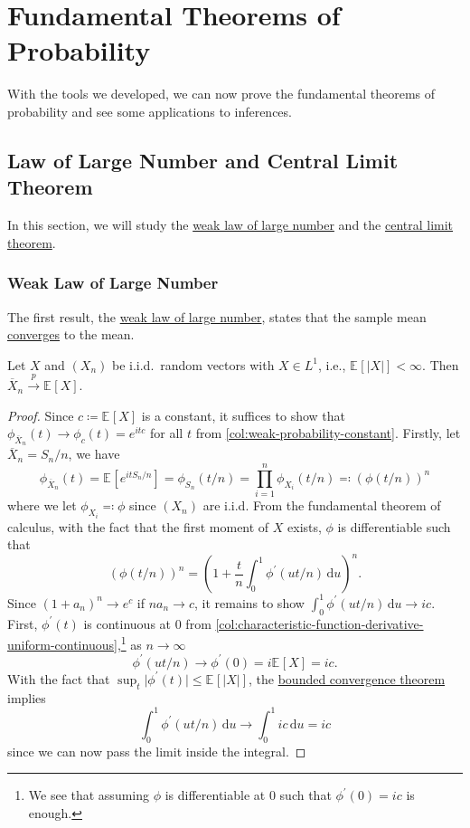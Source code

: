 \chapter{Fundamental Theorems of Probability}
With the tools we developed, we can now prove the fundamental theorems of probability and see some applications to inferences.

\section{Law of Large Number and Central Limit Theorem}
In this section, we will study the \hyperref[thm:WLLN]{weak law of large number} and the \hyperref[thm:CLT]{central limit theorem}.

\subsection{Weak Law of Large Number}
The first result, the \hyperref[thm:WLLN]{weak law of large number}, states that the sample mean \hyperref[def:converge-in-probability]{converges} to the mean.

\begin{theorem}\label{thm:WLLN}
	Let \(X\) and \((X_n)\) be i.i.d.\ random vectors with \(X \in L^1\), i.e., \(\mathbb{E}_{}[\vert X \vert ] < \infty \). Then \(\overline{X} _n \overset{p}{\to } \mathbb{E}_{}[X] \).
\end{theorem}
\begin{proof}
	Since \(c \coloneqq \mathbb{E}_{}[X] \) is a constant, it suffices to show that \(\phi _{\overline{X} _n}(t) \to \phi _{c} (t) = e^{itc}\) for all \(t\) from \autoref{col:weak-probability-constant}. Firstly, let \(\overline{X} _n = S_n / n\), we have
	\[
		\phi _{\overline{X} _n}(t)
		= \mathbb{E}_{}[e^{it S_n / n}]
		= \phi _{S_n}(t / n)
		= \prod_{i=1}^{n} \phi _{X_i}(t / n)
		\eqqcolon \left( \phi (t / n) \right) ^n
	\]
	where we let \(\phi _{X_i} \eqqcolon \phi \) since \((X_n)\) are i.i.d. From the fundamental theorem of calculus, with the fact that the first moment of \(X\) exists, \(\phi \) is differentiable such that
	\[
		\left( \phi (t / n) \right) ^n
		= \left( 1 + \frac{t}{n} \int_{0}^{1} \phi ^{\prime} (u t / n) \,\mathrm{d}u  \right) ^n .
	\]
	Since \((1 + a_n)^n \to e^c\) if \(n a_n \to c\), it remains to show \(\int_{0}^{1} \phi ^{\prime} (u t / n) \,\mathrm{d}u \to ic\). First, \(\phi ^{\prime} (t)\) is continuous at \(0\) from \autoref{col:characteristic-function-derivative-uniform-continuous},\footnote{We see that assuming \(\phi \) is differentiable at \(0\) such that \(\phi ^{\prime} (0) = ic\) is enough.} as \(n \to \infty \)
	\[
		\phi ^{\prime} (u t / n) \to \phi ^{\prime} (0) = i \mathbb{E}_{}[X] = ic.
	\]
	With the fact that \(\sup _t \vert \phi ^{\prime} (t) \vert \leq \mathbb{E}_{}[\vert X \vert ] \), the \href{https://en.wikipedia.org/wiki/Dominated_convergence_theorem}{bounded convergence theorem} implies
	\[
		\int_{0}^{1} \phi ^{\prime} (ut / n) \,\mathrm{d}u
		\to \int_{0}^{1} ic \,\mathrm{d}u
		= ic
	\]
	since we can now pass the limit inside the integral.
\end{proof}

